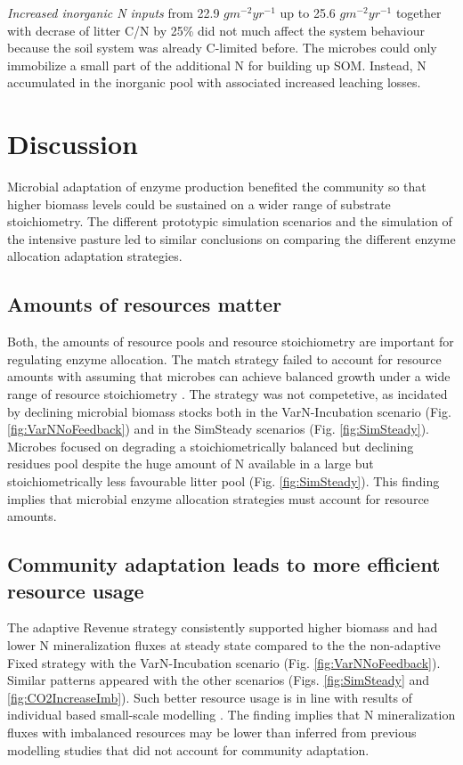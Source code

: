 \textit{Increased inorganic N inputs} from 22.9 $gm^{-2}yr^{-1}$ up to 25.6
$gm^{-2}yr^{-1}$ together with decrase of litter C/N by 25\% did not
much affect the system behaviour because the soil system was already C-limited
before.
The microbes could only immobilize a small part of the additional N for building
up SOM. Instead, N accumulated in the inorganic pool with associated
increased leaching losses.

\section{Discussion}
Microbial adaptation of enzyme production benefited the community so that higher
biomass levels could be sustained on a wider range of substrate stoichiometry.
The different prototypic simulation scenarios and the simulation of the
intensive pasture led to similar conclusions on comparing the different enzyme
allocation adaptation strategies.

\subsection{Amounts of resources matter}
Both, the amounts of resource pools and resource stoichiometry are important for
regulating enzyme allocation. The match strategy failed to account for resource
amounts with assuming that microbes can achieve balanced growth under a wide
range of resource stoichiometry \citep{Moorhead12, Ballantyne14}. The strategy
was not competetive, as incidated by declining microbial biomass stocks both in
the VarN-Incubation scenario (Fig. \ref{fig:VarNNoFeedback}) and in the
SimSteady scenarios (Fig. \ref{fig:SimSteady}). Microbes focused on degrading a
stoichiometrically balanced but declining residues pool despite the huge amount
of N available in a large but stoichiometrically less favourable litter pool
(Fig. \ref{fig:SimSteady}). This finding implies that microbial enzyme
allocation strategies must account for resource amounts.

\subsection{Community adaptation leads to more efficient resource usage}
The adaptive Revenue strategy consistently supported higher biomass and had
lower N mineralization fluxes at steady state compared to the the non-adaptive
Fixed strategy with the VarN-Incubation scenario (Fig.
\ref{fig:VarNNoFeedback}). Similar patterns appeared with the other scenarios
(Figs. \ref{fig:SimSteady} and \ref{fig:CO2IncreaseImb}). Such better resource
usage is in line with results of individual based small-scale modelling
\citep{Kaiser14}.
The finding implies that N mineralization fluxes with imbalanced resources may
be lower than inferred from previous modelling studies that did not account for
community adaptation.

